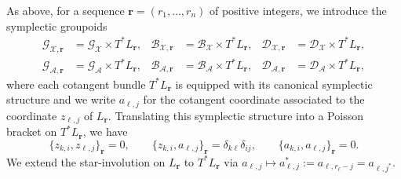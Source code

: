 \documentclass{amsart}
\numberwithin{equation}{section}
\newcommand{\bfr}{{\boldsymbol{r}}}
\newcommand{\cA}{\mathcal{A}}
\newcommand{\cB}{\mathcal{B}}
\newcommand{\cD}{\mathcal{D}}
\newcommand{\cG}{\mathcal{G}}
\newcommand{\cX}{\mathcal{X}}
\begin{document}
As above, for a sequence $\bfr=(r_1,\ldots,r_n)$ of positive integers, we introduce the symplectic groupoids 
\begin{align*}
  \cG_{\cX,\bfr}&=\cG_\cX\times T^*L_\bfr,& \cB_{\cX,\bfr}&=\cB_\cX\times T^*L_\bfr,& \cD_{\cX,\bfr}&=\cD_\cX\times T^*L_\bfr,\\
  \cG_{\cA,\bfr}&=\cG_\cA\times T^*L_\bfr,& \cB_{\cA,\bfr}&=\cB_\cA\times T^*L_\bfr,& \cD_{\cA,\bfr}&=\cD_\cA\times T^*L_\bfr,
\end{align*}
where each cotangent bundle $T^*L_\bfr$ is equipped with its canonical symplectic structure and we write $a_{\ell,j}$ for the cotangent coordinate associated to the coordinate $z_{\ell,j}$ of $L_\bfr$.
Translating this symplectic structure into a Poisson bracket on $T^*L_\bfr$, we have
\begin{equation*}
  \{z_{k,i},z_{\ell,j}\}_\bfr=0,\qquad\{z_{k,i},a_{\ell,j}\}_\bfr=\delta_{k\ell}\delta_{ij},\qquad\{a_{k,i},a_{\ell,j}\}_\bfr=0.
\end{equation*}
We extend the star-involution on $L_\bfr$ to $T^*L_\bfr$ via $a_{\ell,j}\mapsto a^*_{\ell,j}:=a_{\ell,r_\ell-j}=a_{\ell,j^*}$.
\end{document}
